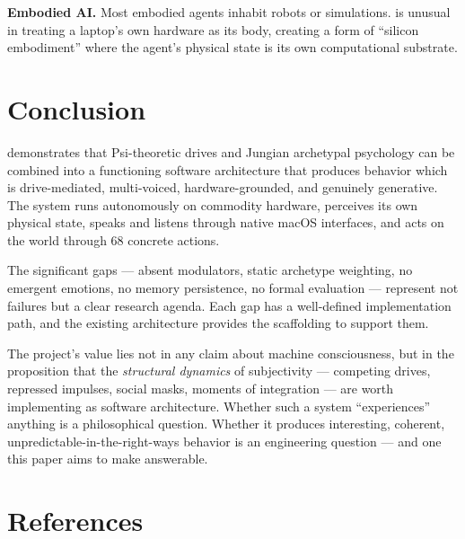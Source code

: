 \documentclass[11pt,oneside]{article}
\begin{document}
\textbf{Embodied AI.}
Most embodied agents inhabit robots or simulations.
\jungagent{} is unusual in treating a laptop's own hardware as its body, creating a form of ``silicon embodiment'' where the agent's physical state is its own computational substrate.


\section{Conclusion}
\label{sec:conclusion}

\jungagent{} demonstrates that Psi-theoretic drives and Jungian archetypal psychology can be combined into a functioning software architecture that produces behavior which is drive-mediated, multi-voiced, hardware-grounded, and genuinely generative.
The system runs autonomously on commodity hardware, perceives its own physical state, speaks and listens through native macOS interfaces, and acts on the world through 68 concrete actions.

The significant gaps --- absent modulators, static archetype weighting, no emergent emotions, no memory persistence, no formal evaluation --- represent not failures but a clear research agenda.
Each gap has a well-defined implementation path, and the existing architecture provides the scaffolding to support them.

The project's value lies not in any claim about machine consciousness, but in the proposition that the \emph{structural dynamics} of subjectivity --- competing drives, repressed impulses, social masks, moments of integration --- are worth implementing as software architecture.
Whether such a system ``experiences'' anything is a philosophical question.
Whether it produces interesting, coherent, unpredictable-in-the-right-ways behavior is an engineering question --- and one this paper aims to make answerable.


\section*{References}
\end{document}
